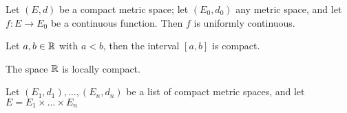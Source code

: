\begin{theorem}
	Let $(E,d)$ be a compact metric space; let $(E_0, d_0)$ any metric space, and let $f : E \to E_0$ be a continuous function. Then $f$ is uniformly continuous.	
\end{theorem}

\begin{theorem}
	Let $a,b \in \mathbb{R}$ with $a < b$, then the interval $[a,b]$ is compact.	
\end{theorem}

\begin{corollary}
The space $\mathbb{R}$ is locally compact.	
\end{corollary}

\begin{theorem}
	Let $(E_1, d_1), \ldots, (E_n, d_n)$ be a list of compact metric spaces, and let $E = E_1 \times \dots \times E_n$ 
\end{theorem}
